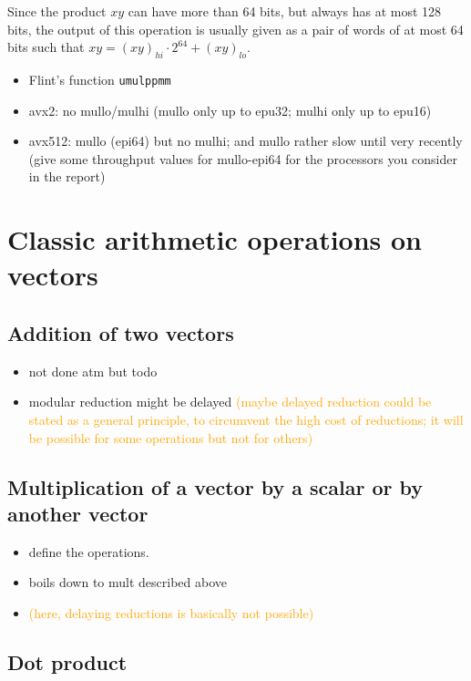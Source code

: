 \documentclass[a4paper]{article}
\begin{document}
Since the product $xy$ can have more than 64 bits, but always has at most 128 bits, the output of this operation is usually given as a pair of words of at most 64 
bits such that $xy = (xy)_{hi}\cdot 2^{64} + (xy)_{lo}$.

\begin{itemize}
    \item Flint's function \texttt{umulppmm}
    \item avx2: no mullo/mulhi (mullo only up to epu32; mulhi only up to epu16)
    \item avx512: mullo (epi64) but no mulhi; and mullo rather slow until very recently (give some throughput values for mullo-epi64 for the processors you consider in the report)
\end{itemize} 

\section{Classic arithmetic operations on vectors}

\subsection{Addition of two vectors}

\begin{itemize}
    \item not done atm but todo 
    \item modular reduction might be delayed
      \textcolor{orange}{(maybe delayed reduction could be stated as a general principle,
      to circumvent the high cost of reductions;
      it will be possible for some operations but not for others)}
\end{itemize}

\subsection{Multiplication of a vector by a scalar or by another vector}

\begin{itemize}
    \item define the operations.
    \item boils down to mult described above
    \item \textcolor{orange}{(here, delaying reductions is basically not possible)}
\end{itemize}

\subsection{Dot product}
\end{document}
